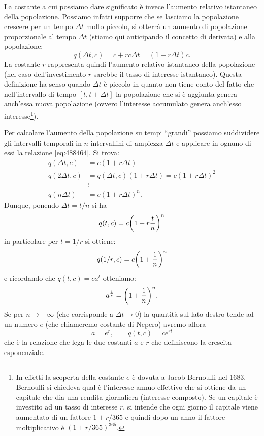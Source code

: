 La costante a cui possiamo dare significato è invece l'aumento relativo
istantaneo della popolazione. Possiamo infatti supporre che
se lasciamo la popolazione crescere per un tempo $\Delta t$ molto piccolo,
si otterrà un aumento di popolazione proporzionale al tempo $\Delta t$
(stiamo qui anticipando il concetto di derivata) e alla popolazione:
\begin{equation}\label{eq:488464}
  q(\Delta t,c) = c + r c \Delta t = (1+r \Delta t) c.
\end{equation}
La costante $r$ rappresenta quindi l'aumento
relativo istantaneo della popolazione (nel caso dell'investimento
$r$ sarebbe il tasso di interesse istantaneo).
Questa definizione ha senso
quando $\Delta t$ è piccolo in quanto non tiene conto del fatto che
nell'intervallo di tempo $[t,t+\Delta t]$ la popolazione che si
è aggiunta genera anch'essa nuova popolazione (ovvero l'interesse
accumulato genera anch'esso interesse\footnote{%
In effetti la scoperta della costante $e$
è dovuta a Jacob Bernoulli nel 1683.
Bernoulli si chiedeva qual è l'interesse annuo effettivo
che si ottiene da un capitale che dia una rendita
giornaliera (interesse composto).
Se un capitale è investito ad un tasso di interesse $r$,
si intende che ogni giorno il capitale
viene aumentato di un fattore $1+r/365$
e quindi dopo un anno il fattore moltiplicativo è $(1+r/365)^365$.
}).

Per calcolare l'aumento della popolazione su tempi ``grandi'' possiamo
suddividere gli intervalli temporali in $n$ intervallini di ampiezza
$\Delta t$ e applicare in ognuno di essi la relazione \eqref{eq:488464}.
Si trova:
\begin{align*}
 q(\Delta t,c) &= c(1+r\Delta t) \\
 q(2\Delta t,c) &= q(\Delta t,c) (1+r\Delta t)  = c(1+r\Delta t)^2\\
 &\vdots \\
 q(n\Delta t) &= c(1+r\Delta t)^n.
\end{align*}
Dunque, ponendo $\Delta t=t/n$ si ha
\[
  q(t,c) = c{\left( 1+r\frac{t}{n} \right)}^n
\]
in particolare per $t=1/r$ si ottiene:
\[
  q(1/r,c) = c{\left( 1+\frac{1}{n} \right)}^n
\]
e ricordando che $q(t,c)=c a^t$ otteniamo:
\[
  a^{\frac 1 r} = {\left( 1+\frac{1}{n} \right)}^n.
\]
Se per $n\to +\infty$ (che corrisponde a $\Delta t \to 0$)
la quantità sul lato destro tende ad un numero $e$ (che chiameremo costante
di Nepero) avremo allora
\[
  a = e^r, \qquad q(t,c) = c e^{rt}
\]
che è la relazione che lega le due costanti $a$ e $r$ che definiscono
la crescita esponenziale.

